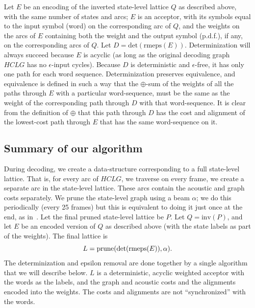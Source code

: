 \documentclass{article}
\def\HCLG{{\mathit{HCLG}}}
\def\inv{{\mathrm{inv}}}
\begin{document}
Let $E$ be an encoding of the inverted state-level lattice $Q$ 
as described above, with the same number of states and arcs; $E$ is an acceptor, with its symbols
equal to the input symbol (word) on the corresponding arc of $Q$, and
the weights on the arcs of $E$ containing both the weight and the output symbol (p.d.f.),
if any, on the corresponding arcs of $Q$.  Let $D = \mathrm{det}(\mathrm{rmeps}(E))$.
Determinization
will always succeed because $E$ is acyclic (as long as the original decoding
graph $\HCLG$ has no $\epsilon$-input cycles).  Because $D$ is deterministic
and $\epsilon$-free, it has only one path for each word sequence. 
Determinization preserves equivalence,
and equivalence is defined in such a way that the $\oplus$-sum of the
weights of all the paths through $E$ with a particular word-sequence, must be the same
as the weight of the corresponding path through $D$ with that word-sequence.
It is clear from the definition of $\oplus$ that this path through
$D$ has the cost and alignment of the lowest-cost path through $E$ that has the
same word-sequence on it.  

\vspace*{-0.075in}
\subsection{Summary of our algorithm}
\vspace*{-0.05in}

During decoding, we create a data-structure
corresponding to a full state-level lattice.  That is, for every arc of $\HCLG$, we traverse
on every frame, we create a separate arc in the state-level lattice.  These arcs
contain the acoustic and graph costs separately.  We prune the state-level graph using
a beam $\alpha$; we do this periodically (every 25 frames) but this is equivalent to
doing it just once at the end, as in~\cite{efficient_general}.  Let the 
final pruned state-level lattice be $P$.
Let $Q = \inv(P)$, and let $E$ be an encoded version of $Q$ as described above (with the
state labels as part of the weights).  The final lattice is
\vspace*{-0.075in}
\begin{equation}
   L = \mathrm{prune}(\mathrm{det}(\mathrm{rmeps}(E)), \alpha) . \vspace*{-0.075in}
\end{equation}
The determinization and epsilon removal are done together by a single algorithm
that we will describe below.  $L$ is a deterministic, acyclic weighted acceptor with the 
words as the labels, and the graph and acoustic costs and the alignments
encoded into the weights.  The costs and alignments are not ``synchronized'' 
with the words.
\end{document}
